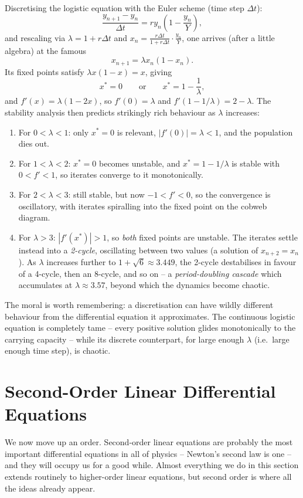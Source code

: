 Discretising the logistic equation with the Euler scheme (time step $\Delta t$):
$$
\frac{y_{n + 1} - y_n}{\Delta t} = r y_n \left(1 - \frac{y_n}{Y}\right),
$$
and rescaling via $\lambda = 1 + r \Delta t$ and $x_n = \frac{r \Delta t}{1 + r\Delta t} \cdot \frac{y_n}{Y}$, one arrives (after a little algebra) at the famous 
$$
x_{n + 1} = \lambda x_n (1 - x_n).
$$
Its fixed points satisfy $\lambda x(1 - x) = x$, giving
$$
x^* = 0 \qquad \text{or} \qquad x^* = 1 - \frac{1}{\lambda},
$$
and $f'(x) = \lambda(1 - 2x)$, so $f'(0) = \lambda$ and $f'(1 - 1/\lambda) = 2 - \lambda$. The stability analysis then predicts strikingly rich behaviour as $\lambda$ increases:
\begin{enumerate}[label=(\roman*)]
	\item For $0 < \lambda < 1$: only $x^* = 0$ is relevant, $|f'(0)| = \lambda< 1$, and the population dies out.
	\item For $1 < \lambda < 2$: $x^* = 0$ becomes unstable, and $x^* = 1 - 1/\lambda$ is stable with $0 < f' < 1$, so iterates converge to it monotonically.
	\item For $2 < \lambda < 3$: still stable, but now $-1 < f' < 0$, so the convergence is oscillatory, with iterates spiralling into the fixed point on the cobweb diagram.
	\item For $\lambda > 3$: $|f'(x^*)| > 1$, so \emph{both} fixed points are unstable. The iterates settle instead into a \emph{2-cycle}, oscillating between two values (a solution of $x_{n+2} = x_n$). As $\lambda$ increases further to $1 + \sqrt 6 \approx 3.449$, the 2-cycle destabilises in favour of a 4-cycle, then an 8-cycle, and so on -- a \emph{period-doubling cascade} which accumulates at $\lambda \approx 3.57$, beyond which the dynamics become chaotic.
\end{enumerate}
The moral is worth remembering: a discretisation can have wildly different behaviour from the differential equation it approximates. The continuous logistic equation is completely tame -- every positive solution glides monotonically to the carrying capacity -- while its discrete counterpart, for large enough $\lambda$ (i.e.\ large enough time step), is chaotic.

\section{Second-Order Linear Differential Equations}

We now move up an order. Second-order linear equations are probably the most important differential equations in all of physics -- Newton's second law is one -- and they will occupy us for a good while. Almost everything we do in this section extends routinely to higher-order linear equations, but second order is where all the ideas already appear.


